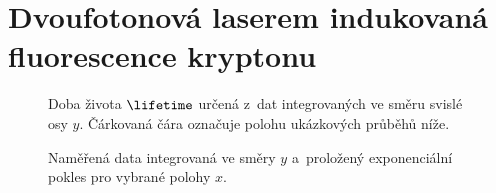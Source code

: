 \chapter[TALIF]{Dvoufotonová laserem indukovaná fluorescence kryptonu}
\label{sec:talif}

\providecommand\xpos{x}
\providecommand\ypos{y}
\providecommand\xmm{x}
\providecommand\ymm{y}

\begin{figure}[htp]
	\centering
	
	\caption{Doba života $\lifetime$ určená z~dat integrovaných ve směru
		svislé osy $\ypos$.
		Čárkovaná čára označuje polohu ukázkových průběhů níže.}
	\label{fig:talif-lifetime-x-params}
	\bigskip
	
	\caption{Naměřená data integrovaná ve směry $\ypos$ a~proložený
		exponenciální pokles pro vybrané polohy $\xpos$.}
	\label{fig:talif-lifetime-x-fits}
\end{figure}
